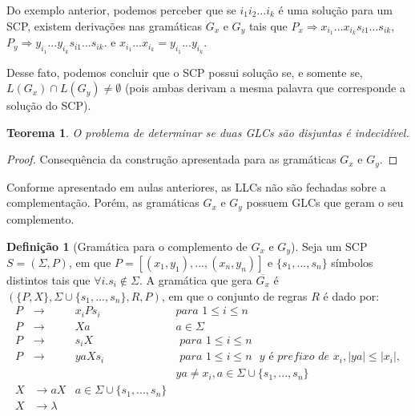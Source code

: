 \documentclass[a4paper]{article}
\newtheorem{Theorem}{Teorema}
\theoremstyle{definition}
\newtheorem{Definition}{Definição}
\begin{document}
    Do exemplo anterior, podemos perceber que se $i_1 i_2 ... i_k$ é uma
    solução para um SCP, existem derivações nas gramáticas $G_x$ e $G_y$ tais
    que $P_x \Rightarrow x_{i_1}...x_{i_k}s_{i1}...s_{ik}$, 
    $P_y \Rightarrow y_{i_1}...y_{i_k}s_{i1}...s_{ik}$. e
    $x_{i_1}...x_{i_k} = y_{i_1}...y_{i_k}$.

    Desse fato, podemos concluir que o SCP possui solução se, e somente se,
    $L(G_x) \cap L(G_y) \neq \emptyset$ (pois ambas derivam a mesma palavra que
    corresponde a solução do SCP).

    \begin{Theorem}
      O problema de determinar se duas GLCs são disjuntas é indecidível.
    \end{Theorem}
    \begin{proof}
      Consequência da construção apresentada para as gramáticas $G_x$ e $G_y$.
    \end{proof}

    Conforme apresentado em aulas anteriores, as LLCs não são fechadas sobre a
    complementação. Porém, as gramáticas $G_x$ e $G_y$ possuem GLCs que geram o
    seu complemento.

    \begin{Definition}[Gramática para o complemento de $G_x$ e $G_y$]
      Seja um SCP $S = (\Sigma, P)$, em que $P = [(x_1,y_1),...,(x_n,y_n)]$ e
      $\{s_1,...,s_n\}$ símbolos distintos tais que $\forall i.
      s_i\not\in\Sigma$. A gramática que gera $\overline{G_x}$ é
      $(\{P,X\}, \Sigma \cup \{s_1,...,s_n\}, R, P)$, em que o conjunto de
      regras $R$ é dado por:
      \[
        \begin{array}{lcll}
          P & \to & x_i P s_i & \textit{para }1 \leq i \leq n \\
          P & \to & Xa        & a \in \Sigma \\
          P & \to & s_i X     & \textit{ para } 1 \leq i \leq n \\
          P & \to & ya X s_i        & \textit{ para }1 \leq i \leq n \textit{ }y
                                \textit{ é prefixo de }x_i, |ya| \leq |x_i|,\\ &
                  & &
                                      ya \neq x_i, a \in \Sigma \cup\{s_1,...,s_n\} \\
          X & \to a X         & a \in \Sigma \cup \{s_1,..., s_n\} \\
          X & \to \lambda \\
        \end{array}
      \]
    \end{Definition}
\end{document}
